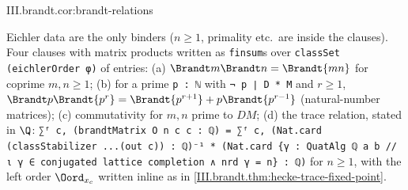 \begin{tfformal}{III.brandt.cor:brandt-relations}
\begin{tffidelity}
Eichler data are the only binders ($n\ge1$, primality etc.\ are inside the clauses). Four clauses with matrix products written as \texttt{finsum}s over \texttt{classSet (eichlerOrder φ)} of entries: (a) $\Brandt m\Brandt n=\Brandt{mn}$ for coprime $m,n\ge1$; (b) for a prime \texttt{p : ℕ} with \texttt{¬ p ∣ D * M} and $r\ge1$, $\Brandt p\Brandt{p^r}=\Brandt{p^{r+1}}+p\Brandt{p^{r-1}}$ (natural-number matrices); (c) commutativity for $m,n$ prime to $DM$; (d) the trace relation, stated in $\Q$: \texttt{∑ᶠ c, (brandtMatrix O n c c : ℚ) = ∑ᶠ c, (Nat.card (classStabilizer ...(out c)) : ℚ)⁻¹ * (Nat.card \{γ : QuatAlg ℚ a b // ι γ ∈ conjugated lattice completion ∧ nrd γ = n\} : ℚ)} for $n\ge1$, with the left order $\Oord_{x_c}$ written inline as in \cref{III.brandt.thm:hecke-trace-fixed-point}.
\end{tffidelity}
\end{tfformal}
